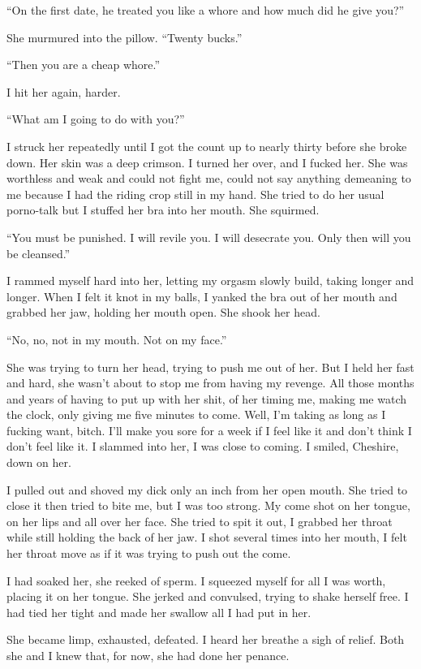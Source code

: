 ``On the first date, he treated you like a whore and how much did he
give you?''

She murmured into the pillow. ``Twenty bucks.''

``Then you are a cheap whore.''

I hit her again, harder.

``What am I going to do with you?''

I struck her repeatedly until I got the count up to nearly thirty before
she broke down. Her skin was a deep crimson. I turned her over, and I
fucked her. She was worthless and weak and could not fight me, could not
say anything demeaning to me because I had the riding crop still in my
hand. She tried to do her usual porno-talk but I stuffed her bra into
her mouth. She squirmed.

``You must be punished. I will revile you. I will desecrate you. Only
then will you be cleansed.''

I rammed myself hard into her, letting my orgasm slowly build, taking
longer and longer. When I felt it knot in my balls, I yanked the bra out
of her mouth and grabbed her jaw, holding her mouth open. She shook her
head.

``No, no, not in my mouth. Not on my face.''

She was trying to turn her head, trying to push me out of her. But I
held her fast and hard, she wasn't about to stop me from having my
revenge. All those months and years of having to put up with her shit,
of her timing me, making me watch the clock, only giving me five minutes
to come. Well, I'm taking as long as I fucking want, bitch. I'll make
you sore for a week if I feel like it and don't think I don't feel like
it. I slammed into her, I was close to coming. I smiled, Cheshire, down
on her.

I pulled out and shoved my dick only an inch from her open mouth. She
tried to close it then tried to bite me, but I was too strong. My come
shot on her tongue, on her lips and all over her face. She tried to spit
it out, I grabbed her throat while still holding the back of her jaw. I
shot several times into her mouth, I felt her throat move as if it was
trying to push out the come.

I had soaked her, she reeked of sperm. I squeezed myself for all I was
worth, placing it on her tongue. She jerked and convulsed, trying to
shake herself free. I had tied her tight and made her swallow all I had
put in her.

She became limp, exhausted, defeated. I heard her breathe a sigh of
relief. Both she and I knew that, for now, she had done her penance.

